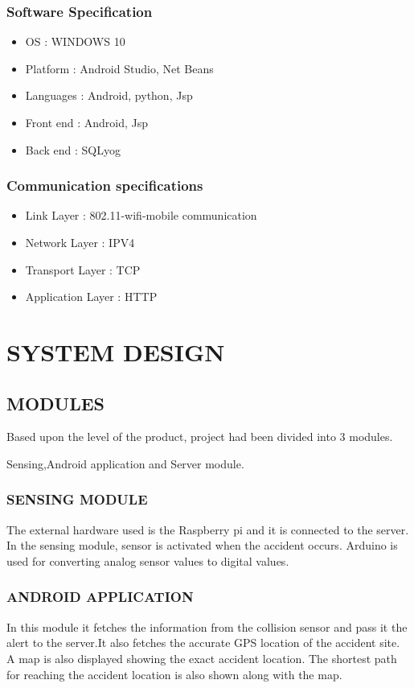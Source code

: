 \documentclass[12pt,a4paper,oneside]{report}
\begin{document}
{\subsection{Software Specification}
\begin{itemize}
\item OS : WINDOWS 10
\item Platform : Android Studio, Net Beans
\item Languages : Android, python, Jsp
\item Front end : Android, Jsp
\item Back end : SQLyog
\end{itemize}
\subsection{Communication specifications}
\begin{itemize}
\item Link Layer : 802.11-wifi-mobile communication
\item Network Layer : IPV4
\item Transport  Layer : TCP
\item Application  Layer : HTTP
\end{itemize}
\chapter{SYSTEM DESIGN}
\section{MODULES}
\par Based upon the level of the product, project had been divided into 3 modules. 
\par Sensing,Android application and Server module.

\subsection{SENSING MODULE}
\par The external hardware used is the Raspberry pi and it is connected to the server. In the sensing module, sensor is activated when the accident occurs. Arduino is used for converting analog sensor values to digital values.

\subsection{ANDROID APPLICATION}
\par In this module it fetches the information from the collision sensor and pass it the alert to the server.It also fetches the accurate GPS location of the accident site. A map is also displayed showing the exact accident location. The shortest path for reaching the accident location is also shown along with the map.
}
\end{document}
